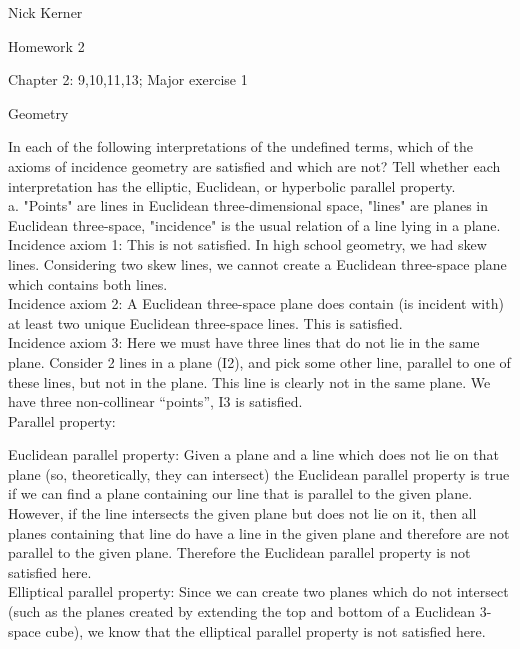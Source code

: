 \documentclass[12pt,letterpaper]{article}
\newcommand{\pro}[1]{\noindent {\bf #1}}
\begin{document}
\begin{flushright}
Nick Kerner

Homework 2

Chapter 2: 9,10,11,13; Major exercise 1
\end{flushright}
\begin{center}
\large{Geometry}\\
\end{center}

\pro{9} In each of the following interpretations of the undefined terms, which of the axioms of incidence geometry are satisfied and which are not?  Tell whether each interpretation has the elliptic, Euclidean, or hyperbolic parallel property. \\

a. "Points" are lines in Euclidean three-dimensional space, "lines" are planes in Euclidean three-space, "incidence" is the usual relation of a line lying in a plane.\\

Incidence axiom 1: This is not satisfied.  In high school geometry, we had skew lines.  Considering two skew lines, we cannot create a Euclidean three-space plane which contains both lines.\\ 


Incidence axiom 2: A Euclidean three-space plane does contain (is incident with) at least two unique Euclidean three-space lines.  This is satisfied.\\


Incidence axiom 3: Here we must have three lines that do not lie in the same plane.  Consider 2 lines in a plane (I2), and pick some other line, parallel to one of these lines, but not in the plane.  This line is clearly not in the same plane.  We have three non-collinear ``points'', I3 is satisfied.\\


Parallel property:

Euclidean parallel property: Given a plane and a line which does not lie on that plane (so, theoretically, they can intersect) the Euclidean parallel property is true if we can find a plane containing our line that is parallel to the given plane.  However, if the line intersects the given plane but does not lie on it, then all planes containing that line do have a line in the given plane and therefore are not parallel to the given plane.  Therefore the Euclidean parallel property is not satisfied here.\\

Elliptical parallel property:  Since we can create two planes which do not intersect (such as the planes created by extending the top and bottom of a Euclidean 3-space cube), we know that the elliptical parallel property is not satisfied here.\\
\end{document}
